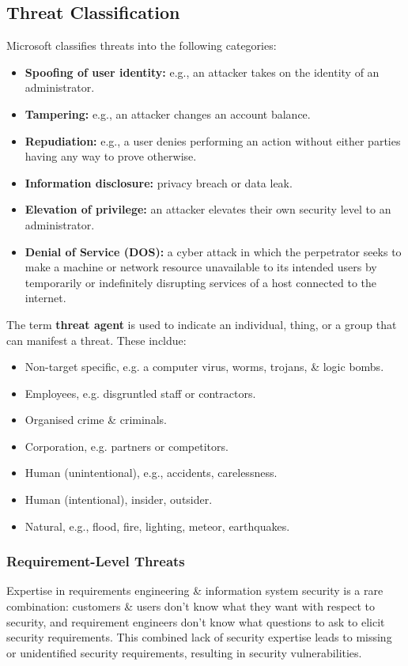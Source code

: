 \documentclass[a4paper,11pt]{article}
\begin{document}
\subsection{Threat Classification}
Microsoft classifies threats into the following categories:
\begin{itemize}
    \item   \textbf{Spoofing of user identity:} e.g., an attacker takes on the identity of an administrator.
    \item   \textbf{Tampering:} e.g., an attacker changes an account balance.
    \item   \textbf{Repudiation:} e.g., a user denies performing an action without either parties having any way to prove otherwise.
    \item   \textbf{Information disclosure:} privacy breach or data leak.
    \item   \textbf{Elevation of privilege:} an attacker elevates their own security level to an administrator.
    \item   \textbf{Denial of Service (DOS):} a cyber attack in which the perpetrator seeks to make a machine or network resource unavailable to its intended users by temporarily or indefinitely disrupting services of a host connected to the internet.
\end{itemize}

The term \textbf{threat agent} is used to indicate an individual, thing, or a group that can manifest a threat.
These incldue:
\begin{itemize}
    \item   Non-target specific, e.g. a computer virus, worms, trojans, \& logic bombs.
    \item   Employees, e.g. disgruntled staff or contractors.
    \item   Organised crime \& criminals.
    \item   Corporation, e.g. partners or competitors.
    \item   Human (unintentional), e.g., accidents, carelessness.
    \item   Human (intentional), insider, outsider.
    \item   Natural, e.g., flood, fire, lighting, meteor, earthquakes.
\end{itemize}

\subsubsection{Requirement-Level Threats}
Expertise in requirements engineering \& information system security is a rare combination: customers \& users don't know what they want with respect to security, and requirement engineers don't know what questions to ask to elicit security requirements.
This combined lack of security expertise leads to missing or unidentified security requirements, resulting in security vulnerabilities.
\end{document}

